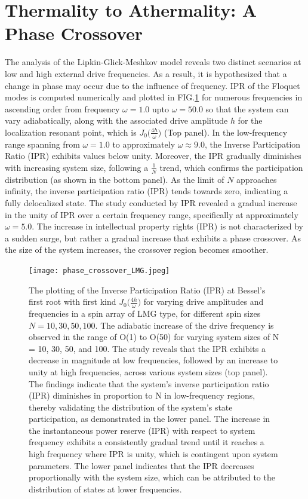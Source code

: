 \documentclass[%
reprint,
superscriptaddress,
amsmath,amssymb,
aps,
prb,
]{revtex4-2}
\begin{document}
	\section{\label{sec:level5}Thermality to Athermality: A Phase Crossover}
	The analysis of the Lipkin-Glick-Meshkov model reveals two distinct scenarios at low and high external drive frequencies. As a result, it is hypothesized that a change in phase may occur due to the influence of frequency. IPR of the Floquet modes is computed numerically and plotted in FIG.\ref{fig:phase_transition} for numerous frequencies in ascending order from frequency $\omega = 1.0$ upto $\omega=50.0$ so that the system can vary adiabatically, along with the associated drive amplitude $h$ for the localization resonant point, which is $J_0\big(\frac{4h}{\omega}\big)$ (Top panel). In the low-frequency range spanning from $\omega = 1.0$ to approximately $\omega \approx 9.0$, the Inverse Participation Ratio (IPR) exhibits values below unity. Moreover, the IPR gradually diminishes with increasing system size, following a $\frac{1}{N}$ trend, which confirms the participation distribution (as shown in the bottom panel). As the limit of $N$ approaches infinity, the inverse participation ratio (IPR) tends towards zero, indicating a fully delocalized state. The study conducted by IPR revealed a gradual increase in the unity of IPR over a certain frequency range, specifically at approximately $\omega = 5.0$. The increase in intellectual property rights (IPR) is not characterized by a sudden surge, but rather a gradual increase that exhibits a phase crossover. As the size of the system increases, the crossover region becomes smoother.
	
	\begin{figure}[!ht]
		\centering
		\texttt{[image: phase\_crossover\_LMG.jpeg]}
		\caption{The plotting of the Inverse Participation Ratio (IPR) at Bessel's first root with first kind $J_0\Big(\frac{4h}{\omega}\Big)$ for varying drive amplitudes and frequencies in a spin array of LMG type, for different spin sizes $N = 10,30,50,100$. The adiabatic increase of the drive frequency is observed in the range of O(1) to O(50) for varying system sizes of N = 10, 30, 50, and 100. The study reveals that the IPR exhibits a decrease in magnitude at low frequencies, followed by an increase to unity at high frequencies, across various system sizes (top panel).  The findings indicate that the system's inverse participation ratio (IPR) diminishes in proportion to N in low-frequency regions, thereby validating the distribution of the system's state participation, as demonstrated in the lower panel. The increase in the instantaneous power reserve (IPR) with respect to system frequency exhibits a consistently gradual trend until it reaches a high frequency where IPR is unity, which is contingent upon system parameters. The lower panel indicates that the IPR decreases proportionally with the system size, which can be attributed to the distribution of states at lower frequencies.}
		\label{fig:phase_transition}
	\end{figure}
\end{document}

